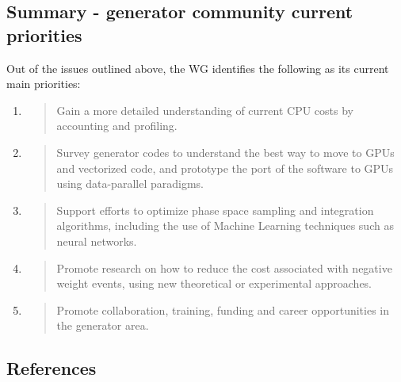 \documentclass[11pt,a4paper]{article}
\begin{document}
\hypertarget{summary---generator-community-current-priorities}{%
\subsection{Summary - generator community current
priorities}\label{summary---generator-community-current-priorities}}

Out of the issues outlined above, the WG identifies the following as its
current main priorities:

\begin{enumerate}
\def\labelenumi{\arabic{enumi}.}
\item
  \begin{quote}
  Gain a more detailed understanding of current CPU costs by accounting
  and profiling.
  \end{quote}
\item
  \begin{quote}
  Survey generator codes to understand the best way to move to GPUs and
  vectorized code, and prototype the port of the software to GPUs using
  data-parallel paradigms.
  \end{quote}
\item
  \begin{quote}
  Support efforts to optimize phase space sampling and integration
  algorithms, including the use of Machine Learning techniques such as
  neural networks.
  \end{quote}
\item
  \begin{quote}
  Promote research on how to reduce the cost associated with negative
  weight events, using new theoretical or experimental approaches.
  \end{quote}
\item
  \begin{quote}
  Promote collaboration, training, funding and career opportunities in
  the generator area.
  \end{quote}
\end{enumerate}

\hypertarget{section-1}{%
\subsection{}\label{section-1}}

\hypertarget{references}{%
\subsection{References}\label{references}}
\end{document}
